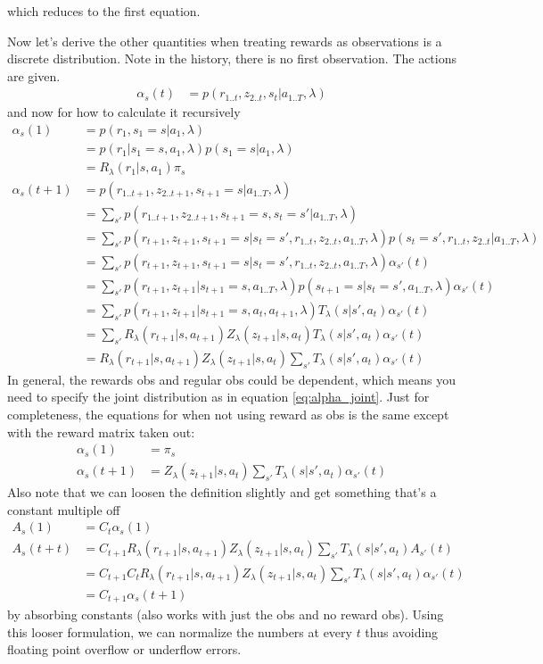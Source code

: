 \documentclass[10pt,english]{article}
\begin{document}
which reduces to the first equation.

Now let's derive the other quantities when treating rewards as observations is a discrete distribution. Note in the history, there is no first observation. The actions are given.
\begin{align}
\alpha_s(t) &= p(r_{1..t},z_{2..t},s_t|a_{1..T},\lambda)
\end{align}
and now for how to calculate it recursively
\begin{align}
\alpha_s(1) &= p(r_1,s_1=s|a_1,\lambda) \\
&= p(r_1|s_1=s,a_1,\lambda)p(s_1=s|a_1,\lambda) \\
&= R_\lambda(r_1|s,a_1)\pi_s \\
\alpha_s(t+1) &= p(r_{1..t+1},z_{2..t+1},s_{t+1}=s|a_{1..T},\lambda) \\
&= \sum_{s'} p(r_{1..t+1},z_{2..t+1},s_{t+1}=s,s_t=s'|a_{1..T},\lambda) \\
&= \sum_{s'} p(r_{t+1},z_{t+1},s_{t+1}=s|s_t=s',r_{1..t},z_{2..t},a_{1..T},\lambda) p(s_t=s',r_{1..t},z_{2..t}|a_{1..T},\lambda) \\
&= \sum_{s'} p(r_{t+1},z_{t+1},s_{t+1}=s|s_t=s',r_{1..t},z_{2..t},a_{1..T},\lambda) \alpha_{s'}(t) \\
&= \sum_{s'} p(r_{t+1},z_{t+1}|s_{t+1}=s,a_{1..T},\lambda) p(s_{t+1}=s|s_t=s',a_{1..T},\lambda) \alpha_{s'}(t) \\
&= \sum_{s'} p(r_{t+1},z_{t+1}|s_{t+1}=s,a_{t},a_{t+1},\lambda) T_\lambda(s|s',a_t) \alpha_{s'}(t) \label{eq:alpha_joint} \\
&= \sum_{s'} R_\lambda(r_{t+1}|s,a_{t+1}) Z_\lambda(z_{t+1}|s,a_t) T_\lambda(s|s',a_t) \alpha_{s'}(t) \\
&= R_\lambda(r_{t+1}|s,a_{t+1}) Z_\lambda(z_{t+1}|s,a_t) \sum_{s'} T_\lambda(s|s',a_t) \alpha_{s'}(t)
\end{align}
In general, the rewards obs and regular obs could be dependent, which means you need to specify the joint distribution as in equation \ref{eq:alpha_joint}. Just for completeness, the equations for when not using reward as obs is the same except with the reward matrix taken out:
\begin{align}
\alpha_s(1) &= \pi_s \\
\alpha_s(t+1) &= Z_\lambda(z_{t+1}|s,a_t) \sum_{s'} T_\lambda(s|s',a_t) \alpha_{s'}(t)
\end{align}
Also note that we can loosen the definition slightly and get something that's a constant multiple off
\begin{align}
A_s(1) &= C_t \alpha_s(1) \\
A_s(t+t) &= C_{t+1} R_\lambda(r_{t+1}|s,a_{t+1}) Z_\lambda(z_{t+1}|s,a_t) \sum_{s'} T_\lambda(s|s',a_t) A_{s'}(t) \\
&= C_{t+1} C_t R_\lambda(r_{t+1}|s,a_{t+1}) Z_\lambda(z_{t+1}|s,a_t) \sum_{s'} T_\lambda(s|s',a_t) \alpha_{s'}(t) \\
&= C_{t+1} \alpha_s(t+1)
\end{align}
by absorbing constants (also works with just the obs and no reward obs). Using this looser formulation, we can normalize the numbers at every $t$ thus avoiding floating point overflow or underflow errors.
\end{document}
